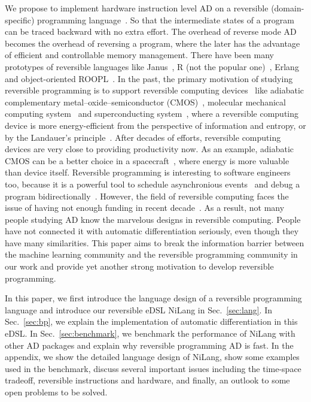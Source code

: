 \documentclass{article}
\newcommand{\<}{\langle}
\renewcommand{\>}{\rangle}
\newcommand{\Sec}[1]{Sec.~\ref{#1}}
\theoremstyle{definition}\newtheorem{definition}{\textit{Definition}}
\begin{document}
    We propose to implement hardware instruction level AD on a reversible (domain-specific) programming language~\cite{Perumalla2013,Frank2017}. So that the intermediate states of a program can be traced backward with no extra effort. The overhead of reverse mode AD becomes the overhead of reversing a program, where the later has the advantage of efficient and controllable memory management. There have been many prototypes of reversible languages like Janus~\cite{Lutz1986}, R (not the popular one)~\cite{Frank1997}, Erlang~\cite{Lanese2018} and object-oriented ROOPL~\cite{Haulund2017}. %
    In the past, the primary motivation of studying reversible programming is to support reversible computing devices~\cite{Frank1999} like adiabatic complementary metal–oxide–semiconductor (CMOS)~\cite{Koller1992}, molecular mechanical computing system~\cite{Merkle2018} and superconducting system~\cite{Likharev1977,Semenov2003}, where a reversible computing device is more energy-efficient from the perspective of information and entropy, or by the Landauer's principle~\cite{Landauer1961}.
    After decades of efforts, reversible computing devices are very close to providing productivity now. As an example, adiabatic CMOS can be a better choice in a spacecraft~\cite{Hanninen2014, Debenedictis2017}, where energy is more valuable than device itself.
    Reversible programming is interesting to software engineers too, because it is a powerful tool to schedule asynchronious events~\cite{Jefferson1985} and debug a program bidirectionally~\cite{Boothe2000}.
    However, the field of reversible computing faces the issue of having not enough funding in recent decade~\cite{Frank2017}. As a result, not many people studying AD know the marvelous designs in reversible computing. People have not connected it with automatic differentiation seriously, even though they have many similarities. This paper aims to break the information barrier between the machine learning community and the reversible programming community in our work and provide yet another strong motivation to develop reversible programming.

    In this paper, we first introduce the language design of a reversible programming language and introduce our reversible eDSL NiLang in \Sec{sec:lang}.
    In \Sec{sec:bp}, we explain the implementation of automatic differentiation in this eDSL.
    In \Sec{sec:benchmark}, we benchmark the performance of NiLang with other AD packages and explain why reversible programming AD is fast.
    In the appendix, we show the detailed language design of NiLang, show some examples used in the benchmark, discuss several important issues including the time-space  tradeoff, reversible instructions and hardware, and finally, an outlook to some open problems to be solved.
\end{document}
